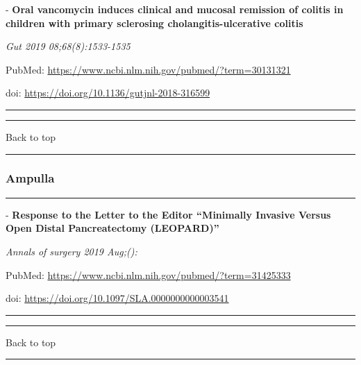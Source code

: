 \documentclass[]{article}
\begin{document}
 - \textbf{Oral vancomycin induces clinical and mucosal remission of
colitis in children with primary sclerosing cholangitis-ulcerative
colitis}

\emph{Gut 2019 08;68(8):1533-1535}

PubMed: \url{https://www.ncbi.nlm.nih.gov/pubmed/?term=30131321}

doi: \url{https://doi.org/10.1136/gutjnl-2018-316599}

{}

{}

\begin{center}\rule{0.5\linewidth}{\linethickness}\end{center}

\begin{center}\rule{0.5\linewidth}{\linethickness}\end{center}

Back to top

\begin{center}\rule{0.5\linewidth}{\linethickness}\end{center}

\pagebreak

\hypertarget{ampulla}{%
\subsubsection{Ampulla}\label{ampulla}}

\begin{center}\rule{0.5\linewidth}{\linethickness}\end{center}

 - \textbf{Response to the Letter to the Editor ``Minimally Invasive
Versus Open Distal Pancreatectomy (LEOPARD)''}

\emph{Annals of surgery 2019 Aug;():}

PubMed: \url{https://www.ncbi.nlm.nih.gov/pubmed/?term=31425333}

doi: \url{https://doi.org/10.1097/SLA.0000000000003541}

{}

{}

\begin{center}\rule{0.5\linewidth}{\linethickness}\end{center}

\begin{center}\rule{0.5\linewidth}{\linethickness}\end{center}

Back to top

\begin{center}\rule{0.5\linewidth}{\linethickness}\end{center}

\pagebreak
\end{document}
